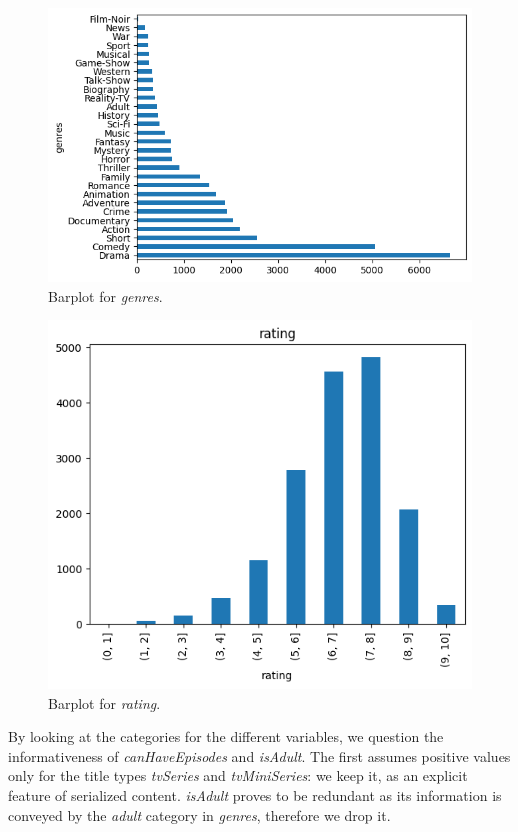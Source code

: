 \begin{figure}
    \includegraphics[width=\columnwidth]{../../results/images/barplot_genres.png}
    \caption{Barplot for \textit{genres}.}
    \label{fig:barplot_genres.png}
\end{figure}

\begin{figure}
    \includegraphics[width=\columnwidth]{../../results/images/barplot_rating.png}
    \caption{Barplot for \textit{rating}.}
    \label{fig:barplot_rating.png}
\end{figure}

By looking at the categories for the different variables, we question the informativeness of \textit{canHaveEpisodes} and \textit{isAdult}. The first assumes positive values only for the title types \textit{tvSeries} and \textit{tvMiniSeries}:  we keep it, as an explicit feature of serialized content. \textit{isAdult} proves to be redundant as its information is conveyed by the \textit{adult} category in \textit{genres}, therefore we drop it.

